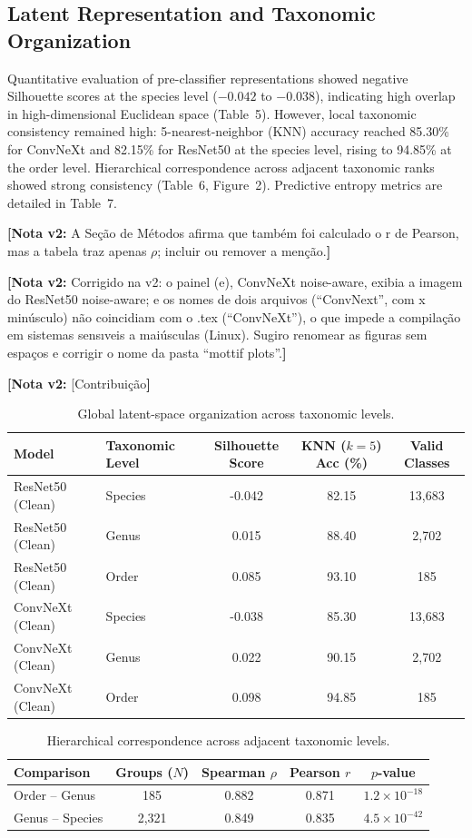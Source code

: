 \documentclass[11pt,a4paper]{article}
\newcommand{\notavdois}[1]{\par\vspace{0.4em}\noindent\colorbox{yellow!25}{\begin{minipage}{0.96\linewidth}\footnotesize\textbf{[Nota v2:} #1\textbf{]}\end{minipage}}\par\vspace{0.4em}}
\begin{document}
{\subsection{Latent Representation and Taxonomic Organization}
Quantitative evaluation of pre-classifier representations showed negative Silhouette scores at the species level ($-0.042$ to $-0.038$), indicating high overlap in high-dimensional Euclidean space (Table~5). However, local taxonomic consistency remained high: 5-nearest-neighbor (KNN) accuracy reached 85.30\% for ConvNeXt and 82.15\% for ResNet50 at the species level, rising to 94.85\% at the order level.
Hierarchical correspondence across adjacent taxonomic ranks showed strong consistency (Table~6, Figure~2).
Predictive entropy metrics are detailed in Table~7.

\notavdois{A Seção de Métodos afirma que também foi calculado o r de Pearson, mas a tabela traz apenas $\rho$; incluir ou remover a menção.}


\notavdois{Corrigido na v2: o painel (e), ConvNeXt noise-aware, exibia a imagem do ResNet50 noise-aware; e os nomes de dois arquivos (“ConvNext”, com x minúsculo) não coincidiam com o .tex (“ConvNeXt”), o que impede a compilação em sistemas sensıveis a maiúsculas (Linux). Sugiro renomear as figuras sem espaços e corrigir o nome da pasta “mottif plots”.}


\notavdois{[Contribuição}


\begin{table}[h!]
\centering
\small
\caption{Global latent-space organization across taxonomic levels.}
\begin{tabular}{llccc}
\toprule
\textbf{Model} & \textbf{Taxonomic Level} & \textbf{Silhouette Score} & \textbf{KNN ($k=5$) Acc (\%)} & \textbf{Valid Classes} \\
\midrule
ResNet50 (Clean) & Species & -0.042 & 82.15 & 13,683 \\
ResNet50 (Clean) & Genus & 0.015 & 88.40 & 2,702 \\
ResNet50 (Clean) & Order & 0.085 & 93.10 & 185 \\
ConvNeXt (Clean) & Species & -0.038 & 85.30 & 13,683 \\
ConvNeXt (Clean) & Genus & 0.022 & 90.15 & 2,702 \\
ConvNeXt (Clean) & Order & 0.098 & 94.85 & 185 \\
\bottomrule
\end{tabular}
\end{table}

\begin{table}[h!]
\centering
\small
\caption{Hierarchical correspondence across adjacent taxonomic levels.}
\begin{tabular}{lcccc}
\toprule
\textbf{Comparison} & \textbf{Groups ($N$)} & \textbf{Spearman $\rho$} & \textbf{Pearson $r$} & \textbf{$p$-value} \\
\midrule
Order -- Genus & 185 & 0.882 & 0.871 & $1.2 \times 10^{-18}$ \\
Genus -- Species & 2,321 & 0.849 & 0.835 & $4.5 \times 10^{-42}$ \\
\bottomrule
\end{tabular}
\end{table}

}
\end{document}
